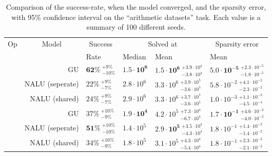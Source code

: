\begin{table}[!h]

\caption{\label{tab:simple-function-static-nalu-gate-table}Comparison of the success-rate, when the model converged, and the sparsity error, with 95\% confidence interval on the ``arithmetic datasets'' task. Each value is a summary of 100 different seeds.}
\centering
\begin{tabular}{crllll}
\toprule
\multicolumn{1}{c}{Op} & \multicolumn{1}{c}{Model} & \multicolumn{1}{c}{Success} & \multicolumn{2}{c}{Solved at} & \multicolumn{1}{c}{Sparsity error} \\
\cmidrule(l{3pt}r{3pt}){1-1} \cmidrule(l{3pt}r{3pt}){2-2} \cmidrule(l{3pt}r{3pt}){3-3} \cmidrule(l{3pt}r{3pt}){4-5} \cmidrule(l{3pt}r{3pt}){6-6}
 &  & Rate & Median & Mean & Mean\\
\midrule
 & GU & $\mathbf{62\%} {~}^{+9\%}_{-10\%}$ & $\mathbf{1.5 \cdot 10^{6}}$ & $\mathbf{1.5 \cdot 10^{6}} {~}^{+3.9 \cdot 10^{4}}_{-3.8 \cdot 10^{4}}$ & $\mathbf{5.0 \cdot 10^{-5}} {~}^{+2.3 \cdot 10^{-5}}_{-1.8 \cdot 10^{-5}}$\\

\nopagebreak
 & NALU (seperate) & $22\% {~}^{+9\%}_{-7\%}$ & $2.8 \cdot 10^{6}$ & $3.3 \cdot 10^{6} {~}^{+3.9 \cdot 10^{5}}_{-3.6 \cdot 10^{5}}$ & $5.8 \cdot 10^{-2} {~}^{+4.1 \cdot 10^{-2}}_{-2.3 \cdot 10^{-2}}$\\

\nopagebreak
\multirow{-3}{*}{\centering\arraybackslash $\bm{\times}$} & NALU (shared) & $24\% {~}^{+9\%}_{-7\%}$ & $2.9 \cdot 10^{6}$ & $3.3 \cdot 10^{6} {~}^{+3.7 \cdot 10^{5}}_{-3.6 \cdot 10^{5}}$ & $1.0 \cdot 10^{-3} {~}^{+1.1 \cdot 10^{-3}}_{-4.5 \cdot 10^{-4}}$\\
\cmidrule{1-6}
 & GU & $37\% {~}^{+10\%}_{-9\%}$ & $\mathbf{1.9 \cdot 10^{4}}$ & $4.2 \cdot 10^{5} {~}^{+7.3 \cdot 10^{4}}_{-6.7 \cdot 10^{4}}$ & $\mathbf{1.7 \cdot 10^{-1}} {~}^{+4.6 \cdot 10^{-2}}_{-4.0 \cdot 10^{-2}}$\\

\nopagebreak
 & NALU (seperate) & $\mathbf{51\%} {~}^{+10\%}_{-10\%}$ & $1.4 \cdot 10^{5}$ & $\mathbf{2.9 \cdot 10^{5}} {~}^{+3.5 \cdot 10^{4}}_{-4.3 \cdot 10^{4}}$ & $1.8 \cdot 10^{-1} {~}^{+1.4 \cdot 10^{-2}}_{-1.4 \cdot 10^{-2}}$\\

\nopagebreak
\multirow{-3}{*}{\centering\arraybackslash $\bm{+}$} & NALU (shared) & $34\% {~}^{+10\%}_{-9\%}$ & $1.8 \cdot 10^{5}$ & $3.1 \cdot 10^{5} {~}^{+4.3 \cdot 10^{4}}_{-5.4 \cdot 10^{4}}$ & $1.8 \cdot 10^{-1} {~}^{+2.3 \cdot 10^{-2}}_{-2.1 \cdot 10^{-2}}$\\
\bottomrule
\end{tabular}
\end{table}
